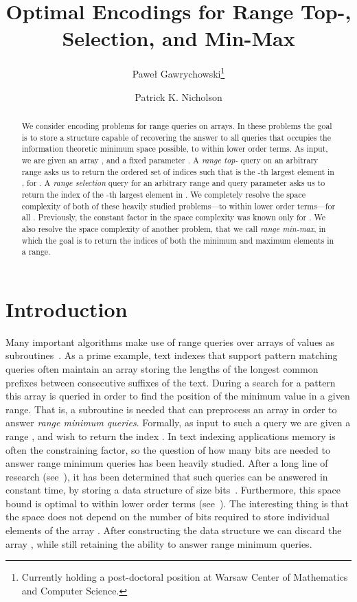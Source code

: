 \documentclass[runningheads]{llncs}
\title{Optimal Encodings for Range Top-\texorpdfstring{}{k},
  Selection, and Min-Max}
\author{Pawe{\l} Gawrychowski\inst{1}\thanks{Currently holding a post-doctoral position at Warsaw Center of Mathematics and Computer Science.}  \and Patrick K. Nicholson\inst{2}}
\institute{Institute of Informatics, University of Warsaw, Poland \and Max-Planck-Institut für Informatik, Saarbrücken, Germany}
\begin{document}
\pagestyle{plain}
\maketitle

\begin{abstract}
We consider encoding problems for range queries on arrays. In these
problems the goal is to store a structure capable of recovering the
answer to all queries that occupies the information theoretic minimum
space possible, to within lower order terms.  As input, we are given
an array , and a fixed parameter .  A
\emph{range top-} query on an arbitrary range  asks us to return the ordered set of indices  such that  is the -th largest
     element in , for .  A \emph{range
       selection} query for an arbitrary range 
     and query parameter  asks us to return the index of
     the -th largest element in .  We completely resolve
     the space complexity of both of these heavily studied
     problems---to within lower order terms---for all .
     Previously, the constant factor in the space complexity was known
     only for .  We also resolve the space complexity of another
     problem, that we call \emph{range min-max}, in which the goal is
     to return the indices of both the minimum and maximum elements in
     a range.
\end{abstract}


\section{Introduction}

Many important algorithms make use of range queries over arrays of
values as subroutines~\cite{N13,S13}.  As a prime example, text
indexes that support pattern matching queries often maintain an array
storing the lengths of the longest common prefixes between consecutive
suffixes of the text.  During a search for a pattern this array is
queried in order to find the position of the minimum value in a given
range.  That is, a subroutine is needed that can preprocess an array
 in order to answer \emph{range minimum queries}.  Formally, as
input to such a query we are given a range ,
and wish to return the index .
In text indexing applications memory is often the constraining factor,
so the question of how many bits are needed to answer range minimum
queries has been heavily studied.  After a long line of research
(see~\cite{BFPSS05,S07}), it has been determined that such queries can
be answered in constant time, by storing a data structure of size  bits~\cite{FH11}.  Furthermore, this space bound is optimal to
within lower order terms (see~\cite[Sec.~1.1.2]{FH11}).  The
interesting thing is that the space does not depend on the number of
bits required to store individual elements of the array .  After
constructing the data structure we can discard the array , while
still retaining the ability to answer range minimum queries.
\end{document}
